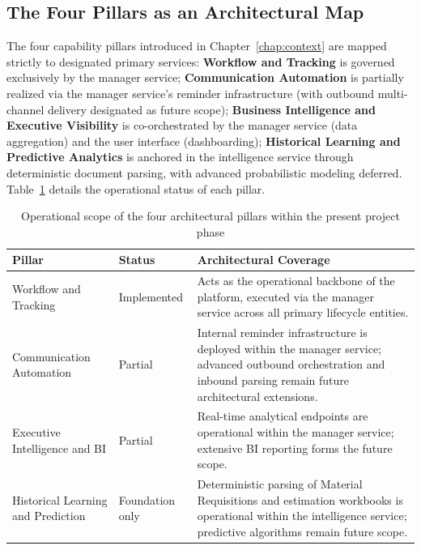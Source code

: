 \subsection{The Four Pillars as an Architectural Map}
The four capability pillars introduced in Chapter~\ref{chap:context} are mapped strictly to designated primary services: \textbf{Workflow and Tracking} is governed exclusively by the manager service; \textbf{Communication Automation} is partially realized via the manager service's reminder infrastructure (with outbound multi-channel delivery designated as future scope); \textbf{Business Intelligence and Executive Visibility} is co-orchestrated by the manager service (data aggregation) and the user interface (dashboarding); \textbf{Historical Learning and Predictive Analytics} is anchored in the intelligence service through deterministic document parsing, with advanced probabilistic modeling deferred. Table~\ref{tab:pillar_scope} details the operational status of each pillar.

\begin{table}[H]
\centering
\renewcommand{\arraystretch}{1.4}
\begin{tabularx}{\textwidth}{|p{3.5cm}|p{2.3cm}|>{\RaggedRight\arraybackslash}X|}
\hline
\rowcolor{lightgray}
\textbf{Pillar} & \textbf{Status} & \textbf{Architectural Coverage} \\ \hline
Workflow and Tracking & Implemented & Acts as the operational backbone of the platform, executed via the manager service across all primary lifecycle entities. \\ \hline
Communication Automation & Partial & Internal reminder infrastructure is deployed within the manager service; advanced outbound orchestration and inbound parsing remain future architectural extensions. \\ \hline
Executive Intelligence and BI & Partial & Real-time analytical endpoints are operational within the manager service; extensive BI reporting forms the future scope. \\ \hline
Historical Learning and Prediction & Foundation only & Deterministic parsing of Material Requisitions and estimation workbooks is operational within the intelligence service; predictive algorithms remain future scope. \\ \hline
\end{tabularx}
\caption{Operational scope of the four architectural pillars within the present project phase}
\label{tab:pillar_scope}
\end{table}

